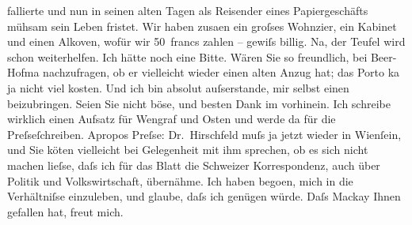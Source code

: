 \begin{ledgroupsized}[t]{13cm}
               fallierte und nun in seinen alten Tagen als Reisender eines Papiergeschäfts mühsam
               sein Leben fristet. Wir haben zusa{\geminationm}en ein groſses
                  Wohnzi{\geminationm}er, ein Kabinet und einen Alkoven, wofür wir
               50 francs zahlen – gewiſs billig. Na, der Teufel wird schon weiterhelfen.\pend
           \pstart
           Ich hätte noch eine Bitte. Wären Sie so freundlich, bei Beer-Hofma{\geminationn} nachzufragen, ob er vielleicht wieder einen {\pb}alten Anzug hat; das Porto ka{\geminationn} ja nicht viel kosten.
               Und ich bin absolut auſserstande, mir selbst einen beizubringen. Seien Sie nicht
               böse, und besten Dank im vorhinein.\pend
           \pstart
           Ich schreibe wirklich einen Aufsatz für Wengraf und Osten und werde da{\geminationn}{ }\label{K_L00499-1v}\label{K_L00499-1h} für die Preſseſchreiben. Apropos Preſse: Dr. Hirschfeld muſs ja jetzt
               wieder in Wienſein, und Sie kö{\geminationn}ten
               vielleicht bei Gelegenheit mit ihm sprechen, ob es sich nicht machen lieſse, daſs ich
               für das Blatt die Schweizer Korrespondenz, auch
               über Politik und Volkswirtschaft, übernähme. Ich haben bego{\geminationn}en, mich in die Verhältniſse einzuleben, und glaube,
               daſs ich genügen würde.\pend
           \pstart
           Daſs Mackay Ihnen gefallen hat, freut mich.

\end{ledgroupsized}
